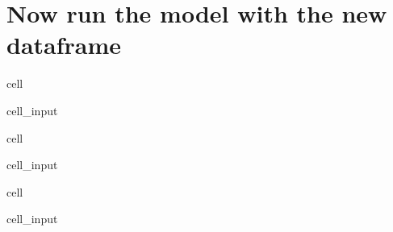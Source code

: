 \documentclass[letterpaper,10pt,english]{jupyterBook}
\begin{document}
\section{Now run the model with the new dataframe}
\label{\detokenize{content/howto/fixing/Fixing variables:now-run-the-model-with-the-new-dataframe}}
\begin{sphinxuseclass}{cell}\begin{sphinxVerbatimInput}

\begin{sphinxuseclass}{cell_input}
\begin{sphinxVerbatim}[commandchars=\\\{\}]
   
\end{sphinxVerbatim}

\end{sphinxuseclass}\end{sphinxVerbatimInput}

\end{sphinxuseclass}
\begin{sphinxuseclass}{cell}\begin{sphinxVerbatimInput}

\begin{sphinxuseclass}{cell_input}
\begin{sphinxVerbatim}[commandchars=\\\{\}]
    
\end{sphinxVerbatim}

\end{sphinxuseclass}\end{sphinxVerbatimInput}

\end{sphinxuseclass}
\begin{sphinxuseclass}{cell}\begin{sphinxVerbatimInput}

\begin{sphinxuseclass}{cell_input}
\begin{sphinxVerbatim}[commandchars=\\\{\}]
    
\end{sphinxVerbatim}

\end{sphinxuseclass}\end{sphinxVerbatimInput}

\end{sphinxuseclass}
\end{document}
